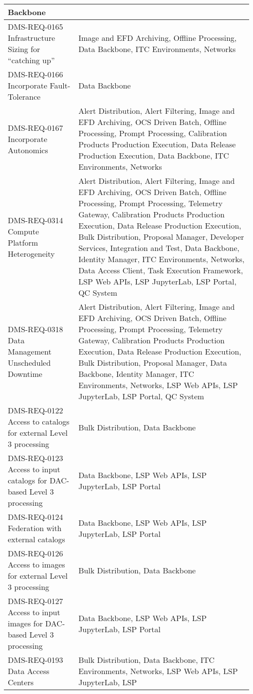 \begin{xtabular}{p{0.4\textwidth}p{0.55\textwidth}}
Backbone\\ \hline
DMS-REQ-0165 Infrastructure Sizing for ``catching up'' & Image and EFD
Archiving, Offline Processing, Data Backbone, ITC Environments,
Networks\\ \hline
DMS-REQ-0166 Incorporate Fault-Tolerance & Data Backbone\\ \hline
DMS-REQ-0167 Incorporate Autonomics & Alert Distribution, Alert
Filtering, Image and EFD Archiving, OCS Driven Batch, Offline
Processing, Prompt Processing, Calibration Products Production
Execution, Data Release Production Execution, Data Backbone, ITC
Environments, Networks\\ \hline
DMS-REQ-0314 Compute Platform Heterogeneity & Alert Distribution, Alert
Filtering, Image and EFD Archiving, OCS Driven Batch, Offline
Processing, Prompt Processing, Telemetry Gateway, Calibration Products
Production Execution, Data Release Production Execution, Bulk
Distribution, Proposal Manager, Developer Services, Integration and
Test, Data Backbone, Identity Manager, ITC Environments, Networks, Data
Access Client, Task Execution Framework, LSP Web APIs, LSP
JupyterLab, LSP Portal, QC System\\ \hline
DMS-REQ-0318 Data Management Unscheduled Downtime & Alert Distribution,
Alert Filtering, Image and EFD Archiving, OCS Driven Batch, Offline
Processing, Prompt Processing, Telemetry Gateway, Calibration Products
Production Execution, Data Release Production Execution, Bulk
Distribution, Proposal Manager, Data Backbone, Identity Manager, ITC
Environments, Networks, LSP Web APIs, LSP JupyterLab, LSP Portal, QC
System\\ \hline
DMS-REQ-0122 Access to catalogs for external Level 3 processing & Bulk
Distribution, Data Backbone\\ \hline
DMS-REQ-0123 Access to input catalogs for DAC-based Level 3 processing &
Data Backbone, LSP Web APIs, LSP JupyterLab, LSP
Portal\\ \hline
DMS-REQ-0124 Federation with external catalogs & Data Backbone, LSP Web APIs,
LSP JupyterLab, LSP Portal\\ \hline
DMS-REQ-0126 Access to images for external Level 3 processing & Bulk
Distribution, Data Backbone\\ \hline
DMS-REQ-0127 Access to input images for DAC-based Level 3 processing &
Data Backbone, LSP Web APIs, LSP JupyterLab, LSP
Portal\\ \hline
DMS-REQ-0193 Data Access Centers & Bulk Distribution, Data Backbone, ITC
Environments, Networks, LSP Web APIs, LSP JupyterLab, LSP

\end{xtabular}

